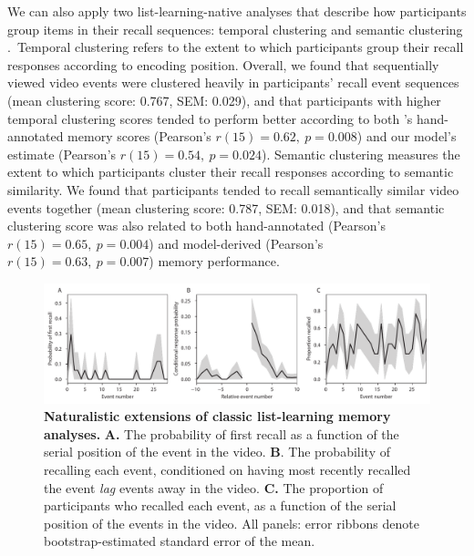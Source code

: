 \documentclass{article}
\begin{document}
We can also apply two list-learning-native analyses that describe how participants group items in their recall sequences: temporal clustering and semantic clustering \citep[][see \textit{Methods} for details]{PolyEtal09}.~Temporal clustering refers to the extent to which participants group their recall responses according to encoding position.  Overall, we found that sequentially viewed video events were clustered heavily in participants' recall event sequences (mean clustering score: 0.767, SEM: 0.029), and that participants with higher temporal clustering scores tended to perform better according to both \cite{ChenEtal17}'s hand-annotated memory scores (Pearson's $r(15) = 0.62,~p = 0.008$) and our model's estimate (Pearson's $r(15) = 0.54,~p = 0.024$).  Semantic clustering measures the extent to which participants cluster their recall responses according to semantic similarity.  We found that participants tended to recall semantically similar video events together (mean clustering score: 0.787, SEM: 0.018), and that semantic clustering score was also related to both hand-annotated  (Pearson's $r(15) = 0.65,~p = 0.004$) and model-derived (Pearson's $r(15) = 0.63,~p = 0.007$) memory performance.

\begin{figure}[t]
  \centering
  \includegraphics[width=1\textwidth]{figs/list_learning}
  \caption{\small \textbf{Naturalistic extensions of classic list-learning memory analyses.} \textbf{A.} The probability of first recall as a function of the serial position of the event in the video. \textbf{B}.  The probability of recalling each event, conditioned on having most recently recalled the event \textit{lag} events away in the video.  \textbf{C.} The proportion of participants who recalled each event, as a function of the serial position of the events in the video.  All panels: error ribbons denote bootstrap-estimated standard error of the mean.}
  \label{fig:list-learning}
\end{figure}
\end{document}
